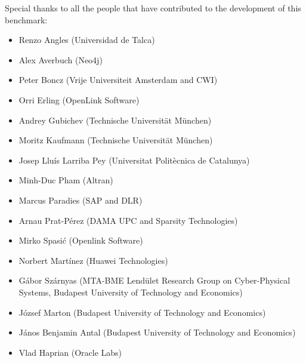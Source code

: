 Special thanks to all the people that have contributed to the development of this benchmark:
\begin{itemize}
  \item Renzo Angles (Universidad de Talca)
  \item Alex Averbuch (Neo4j)
  \item Peter Boncz (Vrije Universiteit Amsterdam and CWI)
  \item Orri Erling (OpenLink Software)
  \item Andrey Gubichev (Technische Universit\"at M\"unchen)
  \item Moritz Kaufmann (Technische Universit\"at M\"unchen)
  \item Josep Llu\'is Larriba Pey (Universitat Polit\`ecnica de Catalunya)
  \item Minh-Duc Pham (Altran)
  \item Marcus Paradies (SAP and DLR)
  \item Arnau Prat-P\'erez (DAMA UPC and Sparsity Technologies)
  \item Mirko Spasi\'c (Openlink Software)
  \item Norbert Mart\'inez (Huawei Technologies)
  \item G\'abor Sz\'arnyas (MTA-BME Lend\"ulet Research Group on Cyber-Physical Systems, Budapest University of Technology and Economics)
  \item J\'ozsef Marton (Budapest University of Technology and Economics)
  \item J\'anos Benjamin Antal (Budapest University of Technology and Economics)
  \item Vlad Haprian (Oracle Labs)
\end{itemize}
